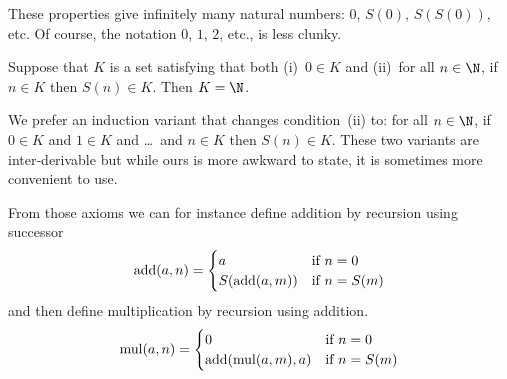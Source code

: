\documentclass{ibl}
\begin{document}
These properties give infinitely many natural numbers:
$0$, $S(0)$, $S(S(0))$, etc.
Of course, the notation $0$, $1$, $2$, etc., is less clunky.

\begin{ax}[Induction]
  Suppose that $K$ is a set satisfying that both (i)~$0\in K$
  and (ii)~for all $n\in\N$, if $n\in K$ then $S(n)\in K$.
  Then $K=\N$.
\end{ax}

We prefer an induction variant that changes
condition~(ii) to: for all $n\in\N$, 
if $0\in K$ and $1\in K$ and \ldots\ and $n\in K$ then $S(n)\in K$.
These two variants are inter-derivable but while ours is 
more awkward to state, it is sometimes more convenient to use.

From those axioms we can for instance 
define addition by recursion using successor
\begin{equation*}
  \operatorname{add}(a,n)=
  \begin{cases}
    a             &\text{if $n=0$}  \\
    S(\operatorname{add}(a,m))  &\text{if $n=S(m)$} 
  \end{cases}
\end{equation*}
and then define multiplication by recursion using addition.
\begin{equation*}
  \operatorname{mul}(a,n)=
  \begin{cases}
    0             &\text{if $n=0$}  \\
    \operatorname{add}(\operatorname{mul}(a,m),a)  &\text{if $n=S(m)$} 
  \end{cases}
\end{equation*}
\end{document}
